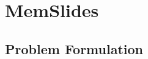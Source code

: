 \documentclass{llmxive}
\begin{document}
\section{MemSlides}


\subsection{Problem Formulation}


\end{document}
